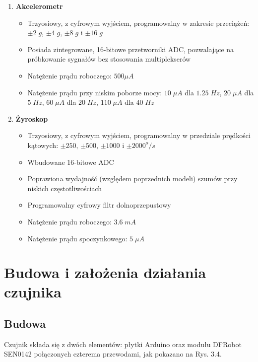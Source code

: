 \begin{enumerate}
    \item \textbf{Akcelerometr}
    \begin{itemize}
        \item Trzyosiowy, z cyfrowym wyjściem, programowalny w zakresie przeciążeń: $\pm 2\;g$, $\pm 4\;g$, $\pm 8\;g$ i $\pm 16\;g$
        \item Posiada zintegrowane, 16-bitowe przetworniki ADC, pozwalające na próbkowanie sygnałów bez stosowania multiplekserów
        \item Natężenie prądu roboczego: $500 \mu A$
        \item Natężenie prądu przy niskim poborze mocy: $10\; \mu A$ dla $1.25\; Hz$, $20\; \mu A$ dla $5\; Hz$, $60\; \mu A$ dla $20\; Hz$, $110\; \mu A$ dla $40\; Hz$
    \end{itemize}
    \item \textbf{Żyroskop}
    \begin{itemize}
        \item Trzyosiowy, z cyfrowym wyjściem, programowalny w przedziale prędkości kątowych: $\pm 250$, $\pm 500$,  $\pm 1000$ i  $\pm 2000 ^{o}/s$
        \item Wbudowane 16-bitowe ADC
        \item Poprawiona wydajność (względem poprzednich modeli) szumów przy niskich częstotliwościach
        \item Programowalny cyfrowy filtr dolnoprzepustowy
        \item Natężenie prądu roboczego: $3.6\; mA$
        \item Natężenie prądu spoczynkowego: $5\; \mu A$
    \end{itemize}
\end{enumerate}



\section{Budowa i założenia działania czujnika}

\subsection{Budowa}

Czujnik składa się z dwóch elementów: płytki Arduino oraz modułu DFRobot SEN0142 połączonych czterema przewodami, jak pokazano na Rys. 3.4.

